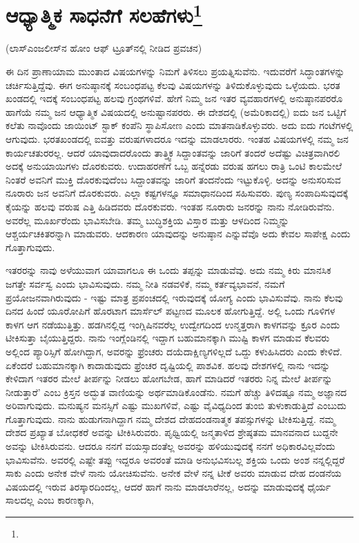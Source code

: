 
\chapter{ಆಧ್ಯಾತ್ಮಿಕ ಸಾಧನೆಗೆ ಸಲಹೆಗಳು\protect\footnote{}}

\begin{center}
(ಲಾಸ್‌ಎಂಜಲೀಸ್‌ನ ಹೋಂ ಆಫ್ ಟ್ರೂತ್‌ನಲ್ಲಿ ನೀಡಿದ ಪ್ರವಚನ)
\end{center}

ಈ ದಿನ ಪ್ರಾಣಾಯಾಮ ಮುಂತಾದ ವಿಷಯಗಳನ್ನು ನಿಮಗೆ ತಿಳಿಸಲು ಪ್ರಯತ್ನಿಸುವೆನು. ಇದುವರೆಗೆ ಸಿದ್ಧಾಂತಗಳನ್ನು ಚರ್ಚಿಸುತ್ತಿದ್ದೆವು. ಈಗ ಅನುಷ್ಠಾನಕ್ಕೆ ಸಂಬಂಧಪಟ್ಟ ಕೆಲವು ವಿಷಯಗಳನ್ನು ತಿಳಿದುಕೊಳ್ಳುವುದು ಒಳ್ಳೆಯದು. ಭರತ ಖಂಡದಲ್ಲಿ ಇದಕ್ಕೆ ಸಂಬಂಧಪಟ್ಟ ಹಲವು ಗ್ರಂಥಗಳಿವೆ. ಹೇಗೆ ನಿಮ್ಮ ಜನ ಇತರ ವ್ಯವಹಾರಗಳಲ್ಲಿ ಅನುಷ್ಠಾನಪರರೊ ಹಾಗೆಯೆ ನಮ್ಮ ಜನ ಆಧ್ಯಾತ್ಮಿಕ ವಿಷಯದಲ್ಲಿ ಅನುಷ್ಟಾನಪರರು. ಈ ದೇಶದಲ್ಲಿ (ಅಮೆರಿಕಾದಲ್ಲಿ) ಐದು ಜನ ಒಟ್ಟಿಗೆ ಕಲೆತು ನಾವೊಂದು ಜಾಯಿಂಟ್ ಸ್ಟಾಕ್ ಕಂಪೆನಿ ಸ್ಥಾಪಿಸೋಣ ಎಂದು ಮಾತನಾಡಿಕೊಳ್ಳುವರು. ಅದು ಐದು ಗಂಟೆಗಳಲ್ಲಿ ಆಗುವುದು. ಭರತಖಂಡದಲ್ಲಿ ಐವತ್ತು ವರುಷಗಳಾದರೂ ಇದನ್ನು ಮಾಡಲಾರರು. ಇಂತಹ ವಿಷಯಗಳಲ್ಲಿ ನಮ್ಮ ಜನ ಕಾರ್ಯಚತುರರಲ್ಲ. ಆದರೆ ಯಾವುದಾದರೊಂದು ತಾತ್ತ್ವಿಕ ಸಿದ್ದಾಂತವನ್ನು ಜಾರಿಗೆ ತಂದರೆ ಅದೆಷ್ಟು ವಿಚಿತ್ರವಾಗಿರಲಿ ಅದಕ್ಕೆ ಅನುಯಾಯಿಗಳು ದೊರಕುವರು. ಉದಾಹರಣೆಗೆ ಒಬ್ಬ ಹನ್ನೆರಡು ವರುಷ ಹಗಲು ರಾತ್ರಿ ಒಂಟಿ ಕಾಲಮೇಲೆ ನಿಂತರೆ ಅವನಿಗೆ ಮುಕ್ತಿ ದೊರಕುವುದೆಂಬ ಸಿದ್ದಾಂತವನ್ನು ಜಾರಿಗೆ ತಂದನೆಂದು ಇಟ್ಟುಕೊಳ್ಳಿ. ಅದನ್ನು ಅನುಸರಿಸುವ ನೂರಾರು ಜನ ಅವನಿಗೆ ದೊರಕುವರು. ಎಲ್ಲಾ ಕಷ್ಟಗಳನ್ನೂ ಸಮಾಧಾನದಿಂದ ಸಹಿಸುವರು. ಪುಣ್ಯ ಸಂಪಾದಿಸುವುದಕ್ಕೆ ಕೈಯನ್ನು ಹಲವು ವರುಷ ಎತ್ತಿ ಹಿಡಿದವರು ದೊರಕುವರು. ಇಂತಹ ನೂರಾರು ಜನರನ್ನು ನಾನು ನೋಡಿರುವೆನು. ಅವರೆಲ್ಲ ಮೂರ್ಖರೆಂದು ಭಾವಿಸಬೇಡಿ. ತಮ್ಮ ಬುದ್ಧಿಶಕ್ತಿಯ ವಿಸ್ತಾರ ಮತ್ತು ಆಳದಿಂದ ನಿಮ್ಮನ್ನು ಆಶ್ಚರ್ಯಚಕಿತರನ್ನಾಗಿ ಮಾಡುವರು. ಆದಕಾರಣ ಯಾವುದನ್ನು ಅನುಷ್ಠಾನ ಎನ್ನುವೆವೊ ಅದು ಕೇವಲ ಸಾಪೇಕ್ಷ ಎಂದು ಗೊತ್ತಾಗುವುದು.

ಇತರರನ್ನು ನಾವು ಅಳೆಯುವಾಗ ಯಾವಾಗಲೂ ಈ ಒಂದು ತಪ್ಪನ್ನು ಮಾಡುವೆವು. ಅದು ನಮ್ಮ ಕಿರು ಮಾನಸಿಕ ಜಗತ್ತೇ ಸರ್ವಸ್ವ ಎಂದು ಭಾವಿಸುವುದು. ನಮ್ಮ ನೀತಿ ನಡವಳಿಕೆ, ನಮ್ಮ ಕರ್ತವ್ಯಭಾವನೆ, ನಮಗೆ ಪ್ರಯೋಜನವಾಗಿರುವುದು - ಇಷ್ಟು ಮಾತ್ರ ಪ್ರಪಂಚದಲ್ಲಿ ಇರುವುದಕ್ಕೆ ಯೋಗ್ಯ ಎಂದು ಭಾವಿಸುವೆವು. ನಾನು ಕೆಲವು ದಿನದ ಹಿಂದೆ ಯೂರೋಪಿಗೆ ಹೊರಟಾಗ ಮಾರ್ಸೆಲ್ ಪಟ್ಟಣದ ಮೂಲಕ ಹೋಗುತ್ತಿದ್ದೆ. ಅಲ್ಲಿ ಒಂದು ಗೂಳಿಗಳ ಕಾಳಗ ಆಗ ನಡೆಯುತ್ತಿತ್ತು. ಹಡಗಿನಲ್ಲಿದ್ದ ಇಂಗ್ಲಿಷಿನವರೆಲ್ಲ ಉದ್ವೇಗದಿಂದ ಉನ್ಮತ್ತರಾಗಿ ಕಾಳಗವನ್ನು ಕ್ರೂರ ಎಂದು ಟೀಕಿಸುತ್ತಾ ಬೈಯುತ್ತಿದ್ದರು. ನಾನು ಇಂಗ್ಲೆಂಡಿನಲ್ಲಿ ಇದ್ದಾಗ ಬಹುಮಾನಕ್ಕಾಗಿ ಮುಷ್ಟಿ ಕಾಳಗ ಮಾಡುವ ಕೆಲವರು ಅಲ್ಲಿಂದ ಪ್ಯಾರಿಸ್ಸಿಗೆ ಹೋಗಿದ್ದಾಗ, ಅವರನ್ನು ಫ್ರೆಂಚರು ದಯೆದಾಕ್ಷಿಣ್ಯಗಳಿಲ್ಲದೆ ಒದ್ದು ಕಳುಹಿಸಿದರು ಎಂದು ಕೇಳಿದೆ. ಏಕೆಂದರೆ ಬಹುಮಾನಕ್ಕಾಗಿ ಕಾದಾಡುವುದು ಫ್ರೆಂಚರ ದೃಷ್ಟಿಯಲ್ಲಿ ಪಾಶವಿಕ. ಹಲವು ದೇಶಗಳಲ್ಲಿ ನಾನು ಇದನ್ನು ಕೇಳಿದಾಗ ಇತರರ ಮೇಲೆ ತೀರ್ಪನ್ನು ನೀಡಲು ಹೋಗಬೇಡ, ಹಾಗೆ ಮಾಡಿದರೆ ಇತರರು ನಿನ್ನ ಮೇಲೆ ತೀರ್ಪನ್ನು ನೀಡುತ್ತಾರೆ' ಎಂಬ ಕ್ರಿಸ್ತನ ಅದ್ಭುತ ವಾಣಿಯನ್ನು ಅರ್ಥಮಾಡಿಕೊಂಡೆನು. ನಮಗೆ ಹೆಚ್ಚು ತಿಳಿದಷ್ಟೂ ನಮ್ಮ ಅಜ್ಞಾನದ ಅರಿವಾಗುವುದು. ಮನುಷ್ಯನ ಮನಸ್ಸಿಗೆ ಎಷ್ಟು ಮುಖಗಳಿವೆ, ಎಷ್ಟು ವೈವಿಧ್ಯದಿಂದ ತುಂಬಿ ತುಳುಕಾಡುತ್ತಿದೆ ಎಂಬುದು ಗೊತ್ತಾಗುವುದು. ನಾನು ಹುಡುಗನಾಗಿದ್ದಾಗ ನಮ್ಮ ದೇಶದ ದೇಹದಂಡನಾತ್ಮಕ ತಪಸ್ಸುಗಳನ್ನು ಟೀಕಿಸುತ್ತಿದ್ದೆ. ನಮ್ಮ ದೇಶದ ಪ್ರಖ್ಯಾತ ಬೋಧಕರೆ ಅವನ್ನು ಟೀಕಿಸಿರುವರು. ಪೃಥ್ವಿಯಲ್ಲಿ ಜನ್ಮತಾಳಿದ ಶ್ರೇಷ್ಠತಮ ಮಾನವನಾದ ಬುದ್ದನೇ ಅವನ್ನು ಟೀಕಿಸಿರುವನು. ಆದರೂ ನನಗೆ ವಯಸ್ಸಾದಂತೆಲ್ಲ ಅವರನ್ನು ಹಳಿಯುವುದಕ್ಕೆ ನನಗೆ ಅಧಿಕಾರವಿಲ್ಲವೆಂದು ಭಾವಿಸುವೆನು. ಅವರಲ್ಲಿ ಎಷ್ಟೇ ತಪ್ಪು ಇದ್ದರೂ ಅವರಂತೆ ಮಾಡಿ ಅನುಭವಿಸಬಲ್ಲ ಶಕ್ತಿಯ ಒಂದು ಅಂಶ ನನ್ನಲ್ಲಿದ್ದರೆ ಸಾಕು ಎಂದು ಅನೇಕ ವೇಳೆ ನಾನು ಯೋಚಿಸುವೆನು. ಅನೇಕ ವೇಳೆ ನನ್ನ ಟೀಕೆ ಅವರು ಮಾಡುವ ದೇಹ ದಂಡನೆಯ ವಿಷಯದಲ್ಲಿ ಇರುವ ತಿರಸ್ಕಾರದಿಂದಲ್ಲ, ಆದರೆ ಹಾಗೆ ನಾನು ಮಾಡಲಾರೆನಲ್ಲ, ಅದನ್ನು ಮಾಡುವುದಕ್ಕೆ ಧೈರ್ಯ ಸಾಲದಲ್ಲ ಎಂಬ ಕಾರಣಕ್ಕಾಗಿ,

